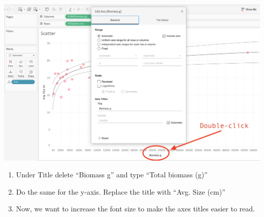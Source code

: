 \documentclass[
]{book}
\providecommand{\tightlist}{%
  \setlength{\itemsep}{0pt}\setlength{\parskip}{0pt}}
\begin{document}
\includegraphics{images/M3S2_edit-axis.png}

\begin{enumerate}
\def\labelenumi{\arabic{enumi}.}
\setcounter{enumi}{1}
\tightlist
\item
  Under Title delete ``Biomass g'' and type ``Total biomass (g)''
\item
  Do the same for the y-axis. Replace the title with ``Avg. Size (cm)''
\item
  Now, we want to increase the font size to make the axes titles easier to read.


\end{enumerate}
\end{document}
